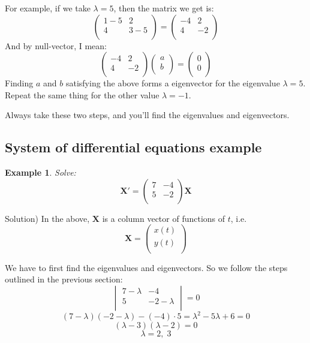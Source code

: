 \documentclass[12pt]{report}
\newtheorem{ex}{Example}[section]
\begin{document}
For example, if we take $\lambda = 5$, then the matrix we get is:
$$\begin{pmatrix} 1-5 & 2 \\ 4 & 3-5 \\ \end{pmatrix} = \begin{pmatrix} -4 & 2 \\ 4 & -2 \\ \end{pmatrix} $$
And by null-vector, I mean:
$$\begin{pmatrix} -4 & 2 \\ 4 & -2 \\ \end{pmatrix} \begin{pmatrix} a \\ b \\ \end{pmatrix} =\begin{pmatrix} 0 \\ 0 \\ \end{pmatrix} $$
Finding $a$ and $b$ satisfying the above forms a eigenvector for the eigenvalue $\lambda = 5$. Repeat the same thing for the other value $\lambda=-1$.

Always take these two steps, and you'll find the eigenvalues and eigenvectors.

\subsection*{System of differential equations example }

\begin{ex} Solve:
$$\mathbf{X'} = \begin{pmatrix} 7 & -4 \\ 5 & -2 \\ \end{pmatrix} \mathbf{X}$$
\end{ex}

Solution) In the above, $\mathbf{X}$ is a column vector of functions of $t$, i.e.
$$\mathbf{X} = \begin{pmatrix} x(t) \\ y(t) \\ \end{pmatrix}$$

We have to first find the eigenvalues and eigenvectors. So we follow the steps outlined in the previous section:
$$\begin{vmatrix} 7-\lambda & -4 \\ 5 & -2-\lambda \\ \end{vmatrix} = 0$$
$$(7-\lambda)(-2-\lambda)-(-4)\cdot 5 = \lambda^2 -5\lambda +6 = 0$$
$$(\lambda -3)(\lambda -2) = 0$$
$$\lambda =2, \; 3$$
\end{document}
